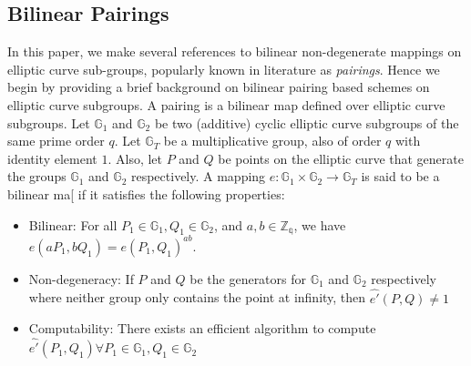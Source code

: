 %  
%  

\subsection{Bilinear Pairings}
\label{subsec:pairings}

In this paper, we make several references to bilinear non-degenerate mappings on elliptic curve sub-groups, popularly known in literature as \emph{pairings}. Hence we begin by providing a brief background on bilinear pairing based schemes on elliptic curve subgroups. A pairing is a bilinear map defined over elliptic curve subgroups. Let $\mathbb{G}_{1}$ and $\mathbb{G}_{2}$ be two (additive) cyclic elliptic curve subgroups of the same prime order $q$. Let $\mathbb{G}_{T}$ be a multiplicative group, also of order $q$ with identity element $1$. Also, let $P$ and $Q$ be points on the elliptic curve that generate the groups $\mathbb{G}_1$ and $\mathbb{G}_2$ respectively. A mapping ${e}:\mathbb{G}_1 \times \mathbb{G}_2\longrightarrow\mathbb{G}_T$ is said to be a bilinear ma[ if it satisfies the following properties: 

\begin{itemize}
 \item Bilinear: For all $P_1 \in \mathbb{G}_1, Q_1\in\mathbb{G}_2$, and $a,b\in\mathbb{Z_q}$, we have ${e}(aP_1,bQ_1) = {e}(P_1,Q_1)^{ab}$.
 \item Non-degeneracy: If $P$ and $Q$ be the generators for $\mathbb{G}_1$ and $\mathbb{G}_2$ respectively where neither group only contains the point at infinity, then $\hat{e'}(P,Q)\neq1$ 
 \item Computability: There exists an efficient algorithm to compute $\hat{e'}(P_1,Q_1)\forall P_1 \in \mathbb{G}_1, Q_1\in\mathbb{G}_2$
\end{itemize}

